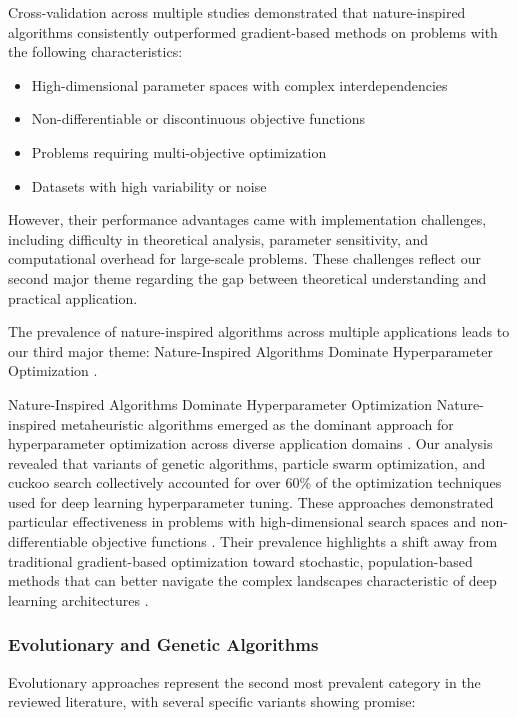 \documentclass[acmsmall]{acmart}
\begin{document}
Cross-validation across multiple studies demonstrated that nature-inspired algorithms consistently outperformed gradient-based methods on problems with the following characteristics:

\begin{itemize}
    \item High-dimensional parameter spaces with complex interdependencies
    \item Non-differentiable or discontinuous objective functions
    \item Problems requiring multi-objective optimization
    \item Datasets with high variability or noise
\end{itemize}

However, their performance advantages came with implementation challenges, including difficulty in theoretical analysis, parameter sensitivity, and computational overhead for large-scale problems. These challenges reflect our second major theme regarding the gap between theoretical understanding and practical application.

The prevalence of nature-inspired algorithms across multiple applications leads to our third major theme: Nature-Inspired Algorithms Dominate Hyperparameter Optimization \citep{Eid20223845, Sagu202535, Samadianfard20191934}.

\begin{themebox}{Nature-Inspired Algorithms Dominate Hyperparameter Optimization}
    Nature-inspired metaheuristic algorithms emerged as the dominant approach for hyperparameter optimization across diverse application domains \citep{Eid20223845, Sagu202535, Samadianfard20191934}. Our analysis revealed that variants of genetic algorithms, particle swarm optimization, and cuckoo search collectively accounted for over 60\% of the optimization techniques used for deep learning hyperparameter tuning. These approaches demonstrated particular effectiveness in problems with high-dimensional search spaces and non-differentiable objective functions \citep{Yang2019}. Their prevalence highlights a shift away from traditional gradient-based optimization toward stochastic, population-based methods that can better navigate the complex landscapes characteristic of deep learning architectures \citep{LeCun2015}.
\end{themebox}

\subsubsection{Evolutionary and Genetic Algorithms}\label{subsubsec:numerical-methods-for-deep-learning-on-big-data-rq11:evolutionary-and-genetic-algorithms}
Evolutionary approaches represent the second most prevalent category in the reviewed literature, with several specific variants showing promise:
\end{document}
